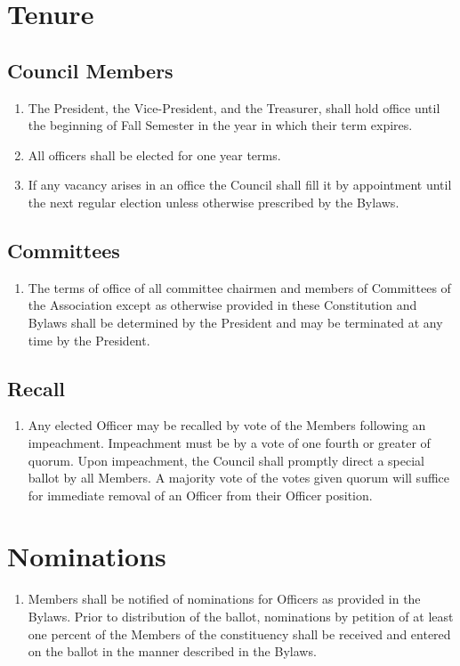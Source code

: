 \section{Tenure}

\subsection{Council Members}
\begin{enumerate}
	\item The President, the Vice-President, and the Treasurer, shall hold office until the beginning of Fall Semester in the year in which their term expires.
	\item All officers shall be elected for one year terms.
	\item If any vacancy arises in an office the Council shall fill it by appointment until the next regular election unless otherwise prescribed by the Bylaws.
\end{enumerate}

\subsection{Committees}
\begin{enumerate}
	\item The terms of office of all committee chairmen and members of Committees of the Association except as otherwise provided in these Constitution and Bylaws shall be determined by the President and may be terminated at any time by the President.
\end{enumerate}

\subsection{Recall}
\begin{enumerate}
	\item Any elected Officer may be recalled by vote of the Members following an impeachment. Impeachment must be by a vote of one fourth or greater of quorum. Upon impeachment, the Council shall promptly direct a special ballot by all Members. A majority vote of the votes given quorum will suffice for immediate removal of an Officer from their Officer position.
\end{enumerate}

\section{Nominations}
\begin{enumerate}
	\item Members shall be notified of nominations for Officers as provided in the Bylaws. Prior to distribution of the ballot, nominations by petition of at least one percent of the Members of the constituency shall be received and entered on the ballot in the manner described in the Bylaws.
\end{enumerate}

